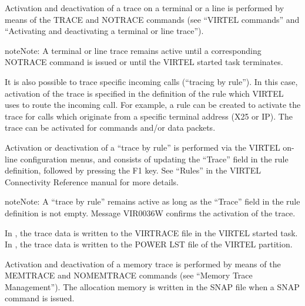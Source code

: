 \documentclass[letterpaper,10pt,english]{sphinxmanual}
\begin{document}
Activation and deactivation of a trace on a terminal or a line is performed by means of the TRACE and NOTRACE commands (see “VIRTEL commands” and “Activating and deactivating a terminal or line trace”).

\begin{sphinxadmonition}{note}{Note:}
A terminal or line trace remains active until a corresponding NOTRACE command is issued or until the VIRTEL started task terminates.
\end{sphinxadmonition}

It is also possible to trace specific incoming calls (“tracing by rule”). In this case, activation of the trace is specified in the definition of the rule which VIRTEL uses to route the incoming call. For example, a rule can be created to activate the trace for calls which originate from a specific terminal address (X25 or IP). The trace can be activated for commands and/or data packets.

Activation or deactivation of a “trace by rule” is performed via the VIRTEL on-line configuration menus, and consists of updating the “Trace” field in the rule definition, followed by pressing the F1 key. See “Rules” in the VIRTEL Connectivity Reference manual for more details.

\begin{sphinxadmonition}{note}{Note:}
A “trace by rule” remains active as long as the “Trace” field in the rule definition is not empty. Message VIR0036W confirms the activation of the trace.
\end{sphinxadmonition}

In , the trace data is written to the VIRTRACE file in the VIRTEL started task.
In , the trace data is written to the POWER LST file of the VIRTEL partition.

Activation and deactivation of a memory trace is performed by means of the MEMTRACE and NOMEMTRACE commands (see “Memory Trace Management”). The allocation memory is written in the SNAP file when a SNAP command is issued.

\ignorespaces 
\end{document}
